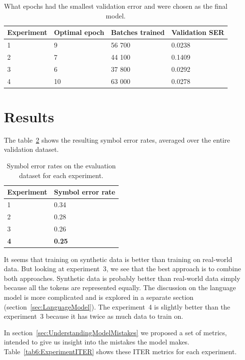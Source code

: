 \begin{table}[h] \centering
    \begin{tabular}{llll}
    \toprule
    \textbf{Experiment} & \textbf{Optimal epoch} & \textbf{Batches trained} & \textbf{Validation SER} \\
    \midrule
    1 & 9  & 56 700 & 0.0238 \\
    2 & 7  & 44 100 & 0.1409 \\
    3 & 6  & 37 800 & 0.0292 \\
    4 & 10 & 63 000 & 0.0278 \\
    \bottomrule
    \end{tabular}
    \caption{What epochs had the smallest validation error and were chosen as the final model.}
    \label{tab6:OptimalEpochs}
\end{table}


\section{Results}
\label{sec:Results}

The table~\ref{tab6:ExperimentSER} shows the resulting symbol error rates, averaged over the entire validation dataset.

\begin{table}[h] \centering
\begin{tabular}{ll}
\toprule
\textbf{Experiment} & \textbf{Symbol error rate} \\
\midrule
1 & 0.34 \\
2 & 0.28 \\
3 & 0.26 \\
\textbf{4} & \textbf{0.25} \\
\bottomrule
\end{tabular}
\caption{Symbol error rates on the evaluation dataset for each experiment.}
\label{tab6:ExperimentSER}
\end{table}

It seems that training on synthetic data is better than training on real-world data. But looking at experiment~3, we see that the best approach is to combine both approaches. Synthetic data is probably better than real-world data simply because all the tokens are represented equally. The discussion on the language model is more complicated and is explored in a separate section (section~\ref{sec:LanguageModel}). The experiment~4 is slightly better than the experiment~3 because it has twice as much data to train on.

In section~\ref{sec:UnderstandingModelMistakes} we proposed a set of metrics, intended to give us insight into the mistakes the model makes. Table~\ref{tab6:ExperimentITER} shows these ITER metrics for each experiment.

